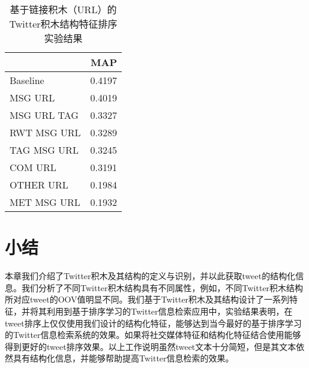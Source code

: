 \begin{table}[htp]
 \centering
 \caption{基于链接积木（URL）的Twitter积木结构特征排序实验结果}
 \label{Res_aaai_TBB_URL}
 \begin{tabular}{|l | r|}
 \hline
 & \textbf{MAP} \\
 \hline
Baseline & 0.4197 \\
MSG URL & 0.4019 \\
MSG URL TAG & 0.3327\\
RWT MSG URL& 0.3289 \\
TAG MSG URL& 0.3245 \\
COM URL & 0.3191 \\
OTHER URL & 0.1984\\
MET MSG URL & 0.1932\\
 \hline
 \end{tabular}
\end{table}

\vspace{0.5cm}

\section{小结}
本章我们介绍了Twitter积木及其结构的定义与识别，并以此获取tweet的结构化信息。我们分析了不同Twitter积木结构具有不同属性，例如，不同Twitter积木结构所对应tweet的OOV值明显不同。我们基于Twitter积木及其结构设计了一系列特征，并将其利用到基于排序学习的Twitter信息检索应用中，实验结果表明，在tweet排序上仅仅使用我们设计的结构化特征，能够达到当今最好的基于排序学习的Twitter信息检索系统的效果。如果将社交媒体特征和结构化特征结合使用能够得到更好的tweet排序效果。以上工作说明虽然tweet文本十分简短，但是其文本依然具有结构化信息，并能够帮助提高Twitter信息检索的效果。
